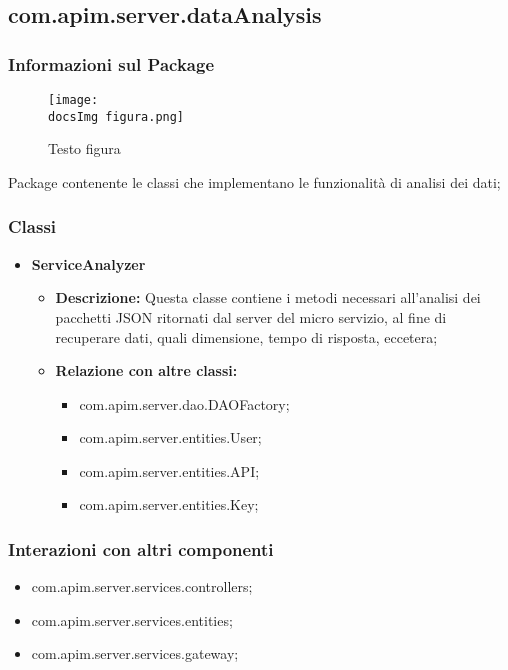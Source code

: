 {{      \subsection{com.apim.server.dataAnalysis}{
  \subsubsection{Informazioni sul Package}
    \begin{figure}[ht]
      \centering
      \texttt{[image: \\docsImg figura.png]}
      \caption{Testo figura}
      \label{Testo figura}
    \end{figure}
    Package  contenente le classi che implementano le funzionalità di analisi dei dati;
    \subsubsection{Classi}
    \begin{itemize} \itemsep1pt
    \item \textbf{ServiceAnalyzer}
    \begin{itemize}
    \item \textbf{Descrizione:} Questa classe contiene i metodi necessari all'analisi dei pacchetti JSON ritornati dal server del micro servizio, al fine di recuperare dati, quali dimensione, tempo di risposta, eccetera;
    \item \textbf{Relazione con altre classi:}
    \begin{itemize}
    \item com.apim.server.dao.DAOFactory;
    \item com.apim.server.entities.User;
    \item com.apim.server.entities.API;
    \item com.apim.server.entities.Key;
    \end{itemize}
    \end{itemize}
    \end{itemize}
    \subsubsection{Interazioni con altri componenti}
    \begin{itemize}
    \item com.apim.server.services.controllers;
    \item com.apim.server.services.entities;
    \item com.apim.server.services.gateway;
    \end{itemize}
  }
}}
